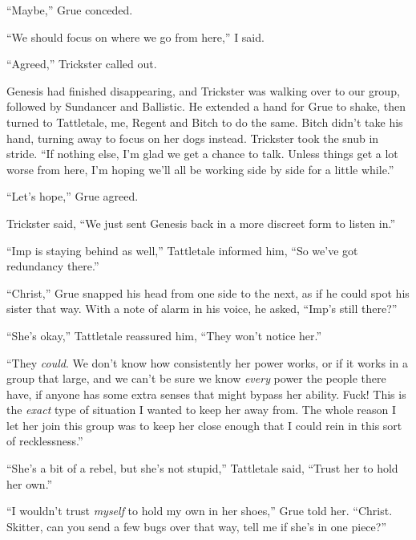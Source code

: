 ``Maybe,'' Grue conceded.



``We should focus on where we go from here,'' I said.



``Agreed,'' Trickster called out.



Genesis had finished disappearing, and Trickster was walking over to our group, followed by Sundancer and Ballistic.  He extended a hand for Grue to shake, then turned to Tattletale, me, Regent and Bitch to do the same.  Bitch didn't take his hand, turning away to focus on her dogs instead.  Trickster took the snub in stride.  ``If nothing else, I'm glad we get a chance to talk.  Unless things get a lot worse from here, I'm hoping we'll all be working side by side for a little while.''



``Let's hope,'' Grue agreed.



Trickster said, ``We just sent Genesis back in a more discreet form to listen in.''



``Imp is staying behind as well,'' Tattletale informed him, ``So we've got redundancy there.''



``Christ,'' Grue snapped his head from one side to the next, as if he could spot his sister that way.  With a note of alarm in his voice, he asked, ``Imp's still there?''



``She's okay,'' Tattletale reassured him, ``They won't notice her.''



``They \emph{could}.  We don't know how consistently her power works, or if it works in a group that large, and we can't be sure we know \emph{every }power the\emph{ }people there have, if anyone has some extra senses that might bypass her ability.  Fuck!  This is the \emph{exact} type of situation I wanted to keep her away from.  The whole reason I let her join this group was to keep her close enough that I could rein in this sort of recklessness.''



``She's a bit of a rebel, but she's not stupid,'' Tattletale said, ``Trust her to hold her own.''



``I wouldn't trust \emph{myself} to hold my own in her shoes,'' Grue told her.  ``Christ.  Skitter, can you send a few bugs over that way, tell me if she's in one piece?''



